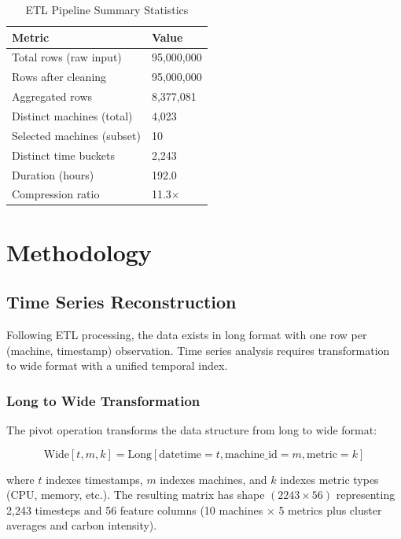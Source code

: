 \documentclass[12pt]{report}
\begin{document}
\begin{table}[H]
\centering
\caption{ETL Pipeline Summary Statistics}
\label{tab:etl_summary}
\begin{tabular}{ll}
\toprule
\textbf{Metric} & \textbf{Value} \\
\midrule
Total rows (raw input) & 95,000,000 \\
Rows after cleaning & 95,000,000 \\
Aggregated rows & 8,377,081 \\
Distinct machines (total) & 4,023 \\
Selected machines (subset) & 10 \\
Distinct time buckets & 2,243 \\
Duration (hours) & 192.0 \\
Compression ratio & 11.3$\times$ \\
\bottomrule
\end{tabular}
\end{table}



\chapter{Methodology}

\section{Time Series Reconstruction}

Following ETL processing, the data exists in long format with one row per (machine, timestamp) observation. Time series analysis requires transformation to wide format with a unified temporal index.

\subsection{Long to Wide Transformation}

The pivot operation transforms the data structure from long to wide format:

\begin{equation}
\text{Wide}[t, m, k] = \text{Long}[\text{datetime}=t, \text{machine\_id}=m, \text{metric}=k]
\end{equation}

where $t$ indexes timestamps, $m$ indexes machines, and $k$ indexes metric types (CPU, memory, etc.). The resulting matrix has shape $(2243 \times 56)$ representing 2,243 timesteps and 56 feature columns (10 machines $\times$ 5 metrics plus cluster averages and carbon intensity).
\end{document}

